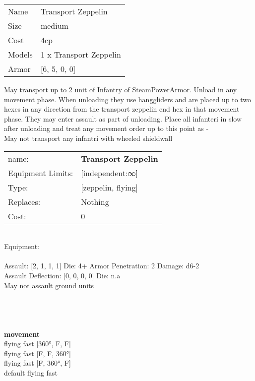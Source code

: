 \begin{tabular}{ll}
  Name & Transport Zeppelin \\
  Size & medium\\
  Cost & 4cp\\
  Models & 1 x Transport Zeppelin\\
  Armor & [6, 5, 0, 0]\\
\end{tabular}

\noindent May transport up to 2 unit of Infantry of SteamPowerArmor. Unload in any movement phase. When unloading they use hanggliders and are placed up to two hexes in any direction from the transport zeppelin end hex in that movement phase. They may enter assault as part of unloading. Place all infanteri in slow after unloading and treat any movement order up to this point as -\\ 
May not transport any infantri with wheeled shieldwall\\ 


\noindent
\begin{tabular}{ll}
name: &{\bf Transport Zeppelin } \\
Equipment Limits: &[independent:∞] \\
Type: &[zeppelin, flying] \\
Replaces: &Nothing \\
Cost: & 0\\
\end{tabular}
\ \\
Equipment:  \\
\ \\
Assault: [2, 1, 1, 1] Die: 4+ Armor Penetration: 2 Damage: d6-2 \\
Assault Deflection: [0, 0, 0, 0] Die: n.a\\
\indent May not assault ground units\\ 
 
\ \\

\ \\
 
\ \\



\ \\ {\bf movement } \\
flying fast [360°, F, F] \\
flying fast [F, F, 360°] \\
flying fast [F, 360°, F] \\
default flying fast \\


